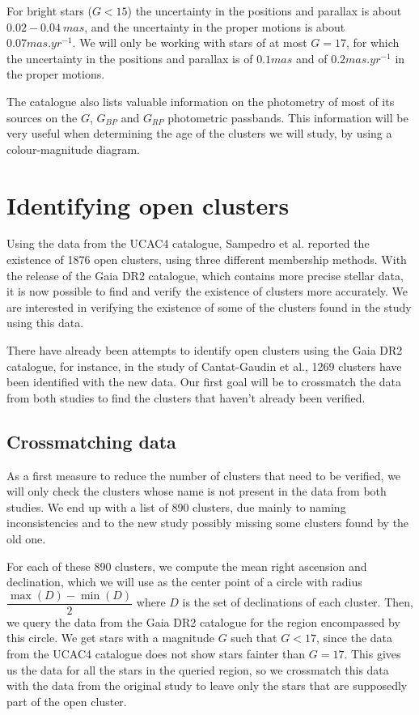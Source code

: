 \documentclass[twocolumn]{revtex4}
\begin{document}
For bright stars ($G < 15$) the uncertainty in the positions and parallax is about $0.02-0.04\ \si{mas}$, and the uncertainty in the proper motions is about $0.07 \si{mas.yr^{-1}}$. We will only be working with stars of at most $G = 17$, for which the uncertainty in the positions and parallax is of $0.1 \si{mas}$ and of $0.2 \si{mas.yr^{-1}}$ in the proper motions.

The catalogue also lists valuable information on the photometry of most of its sources on the $G$, $G_{BP}$ and $G_{RP}$ photometric passbands. This information will be very useful when determining the age of the clusters we will study, by using a colour-magnitude diagram.

\section{Identifying open clusters}
Using the data from the UCAC4 catalogue, Sampedro et al.\cite{sampedro} reported the existence of 1876 open clusters, using three different membership methods. With the release of the Gaia DR2 catalogue, which contains more precise stellar data, it is now possible to find and verify the existence of clusters more accurately. We are interested in verifying the existence of some of the clusters found in the study using this data.

There have already been attempts to identify open clusters using the Gaia DR2 catalogue, for instance, in the study of Cantat-Gaudin et al.\cite{cantat-gaudin}, 1269 clusters have been identified with the new data. Our first goal will be to crossmatch the data from both studies to find the clusters that haven't already been verified.

\subsection{Crossmatching data}
As a first measure to reduce the number of clusters that need to be verified, we will only check the clusters whose name is not present in the data from both studies. We end up with a list of 890 clusters, due mainly to naming inconsistencies and to the new study possibly missing some clusters found by the old one.

For each of these 890 clusters, we compute the mean right ascension and declination, which we will use as the center point of a circle with radius $\dfrac{\max(D) - \min(D)}{2}$ where $D$ is the set of declinations of each cluster. Then, we query the data from the Gaia DR2 catalogue for the region encompassed by this circle. We get stars with a magnitude $G$ such that $G < 17$, since the data from the UCAC4 catalogue does not show stars fainter than $G = 17$. This gives us the data for all the stars in the queried region, so we crossmatch this data with the data from the original study to leave only the stars that are supposedly part of the open cluster.
\end{document}
